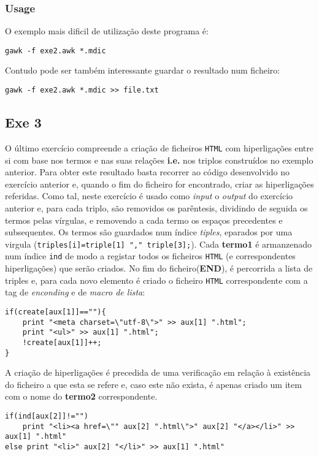 \documentclass{llncs}
\begin{document}
\subsubsection{Usage}
O exemplo mais dificil de utilização deste programa é:
\begin{verbatim}
gawk -f exe2.awk *.mdic
\end{verbatim}
Contudo pode ser também interessante guardar o resultado num ficheiro:
\begin{verbatim}
gawk -f exe2.awk *.mdic >> file.txt
\end{verbatim}

\subsection{Exe 3}
O último exercício compreende a criação de ficheiros \texttt{HTML} com hiperligações entre si com base nos termos e nas suas relações \textbf{i.e.} nos triplos construídos no exemplo anterior. Para obter este resultado basta recorrer ao código desenvolvido no exercício anterior e, quando o fim do ficheiro for encontrado, criar as hiperligações referidas. 
Como tal, neste exercício é usado como \textit{input} o \textit{output} do exercício anterior e, para cada triplo, são removidos os parêntesis, dividindo de seguida os termos pelas vírgulas, e removendo a cada termo os espaços precedentes e subsequentes. Os termos são guardados num índice \textit{tiples}, eparados por uma virgula (\verb|triples[i]=triple[1] "," triple[3];|). Cada \textbf{termo1} é armanzenado num índice \texttt{ind} de modo a registar todos os ficheiros \texttt{HTML} (e correspondentes hiperligações) que serão criados. No fim do ficheiro(\textbf{END}), é percorrida a lista de triples e, para cada novo elemento é criado o ficheiro \texttt{HTML} correspondente com a tag de \textit{enconding} e de \textit{macro de lista}:

\begin{verbatim}
if(create[aux[1]]==""){
    print "<meta charset=\"utf-8\">" >> aux[1] ".html";
    print "<ul>" >> aux[1] ".html";
    !create[aux[1]]++;
}
\end{verbatim}

A criação de hiperligações é precedida de uma verificação em relação à existência do ficheiro a que esta se refere e, caso este não exista, é apenas criado um item com o nome do \textbf{termo2} correspondente.

\begin{verbatim}
if(ind[aux[2]]!="") 
    print "<li><a href=\"" aux[2] ".html\">" aux[2] "</a></li>" >> aux[1] ".html"
else print "<li>" aux[2] "</li>" >> aux[1] ".html"
\end{verbatim}
\end{document}
